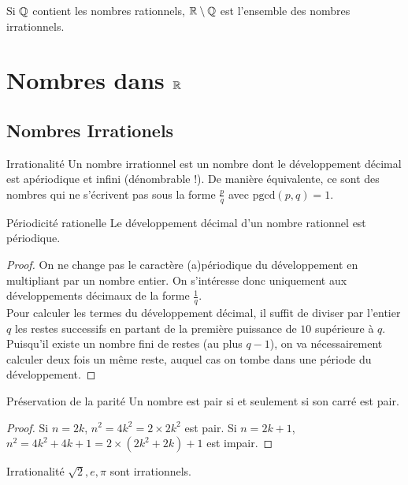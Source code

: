 \documentclass{cours}
\begin{document}
    Si $\mathbb{Q}$ contient les nombres rationnels, $\mathbb{R} \setminus \mathbb{Q}$ est l'ensemble des nombres irrationnels.

    \section{Nombres dans $\mathbb{R}$}
    \subsection{Nombres Irrationels}
    \begin{définition}{Irrationalité}{}
        Un nombre irrationnel est un nombre dont le développement décimal est apériodique et infini (dénombrable !). De manière équivalente, ce sont des nombres qui ne s'écrivent pas sous la forme $\frac{p}{q}$ avec $\text{pgcd}(p, q) = 1$.
    \end{définition}

    \begin{théorème}{Périodicité rationelle}{}
        Le développement décimal d'un nombre rationnel est périodique.
    \end{théorème}

    \begin{proof}
        On ne change pas le caractère (a)périodique du développement en multipliant par un nombre entier. On s'intéresse donc uniquement aux développements décimaux de la forme $\frac{1}{q}$.\\
        Pour calculer les termes du développement décimal, il suffit de diviser par l'entier $q$ les restes successifs en partant de la première puissance de $10$ supérieure à $q$.\\
        Puisqu'il existe un nombre fini de restes (au plus $q-1$), on va nécessairement calculer deux fois un même reste, auquel cas on tombe dans une période du développement.
    \end{proof}
    
    \begin{lemme}{Préservation de la parité}{}
        Un nombre est pair si et seulement si son carré est pair.
    \end{lemme}
    \begin{proof}
        Si $n = 2k$, $n^{2} = 4k^{2} = 2\times 2k^{2}$ est pair. Si $n = 2k +1$, $n^{2} = 4k^{2} + 4k + 1 = 2\times(2k^{2} + 2k) + 1$ est impair.
    \end{proof}

    \begin{propositionfr}{Irrationalité}{}
        $\sqrt{2}, e, \pi$ sont irrationnels.
    \end{propositionfr}
    
\end{document}
